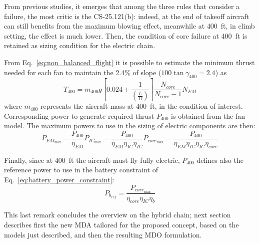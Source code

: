 From previous studies, it emerges that among the three rules that consider a failure, the most critic is the CS-25.121(b): indeed, at the end of takeoff aircraft can still benefits from the maximum blowing effect, meanwhile at 400~ft, in climb setting, the effect is much lower. 
Then, the condition of core failure at 400~ft is retained as sizing condition for the electric chain. 

From Eq.~\eqref{eq:non_balanced_flight} it is possible to estimate the minimum thrust needed for each fan to maintain the 2.4\% of slope ($100\tan\gamma_{400} = 2.4$) as
\begin{equation}
	\label{eq:thrust_400}
	T_{400} = m_{400}g\left[0.024 + \frac{1}{\left(\frac{L}{D}\right)}\right]\frac{N_{core}}{N_{core}-1}N_{EM}
\end{equation}
where $m_{400}$ represents the aircraft mass at 400~ft, in the condition of interest.
Corresponding power to generate required thrust $P_{400}$ is obtained from the fan model.
The maximum powers to use in the sizing of electric components are then:
\begin{subequations}
	\label{eq:max_power_elec_comp}
	\begin{equation}
		\label{eq:max_power_em}
		P_{EM_{\max}} = \frac{P_{400}}{\eta_{EM}}
	\end{equation}
	
	\begin{equation}
		\label{eq:max_power_ic}
		P_{IC_{\max}} = \frac{P_{400}}{\eta_{EM}\eta_{IC}\eta_{IC}}
	\end{equation}	
	
	\begin{equation}
		\label{eq:max_power_core}
		P_{core_{\max}} = \frac{P_{400}}{\eta_{EM}\eta_{IC}\eta_{IC}\eta_{core}}
	\end{equation}
\end{subequations}

Finally, since at 400~ft the aircraft must fly fully electric, $P_{400}$ defines also the reference power to use in the battery constraint of Eq.~\eqref{eq:battery_power_constraint}:
\begin{equation}
	\label{eq:battery_power_ref_400}
	P_{b_{ref}} = \frac{P_{core_{\max}}}{\eta_{core}\eta_{IC}\eta_b}
\end{equation}

This last remark concludes the overview on the hybrid chain; next section describes first the new MDA tailored for the proposed concept, based on the models just described, and then the resulting MDO formulation. 

